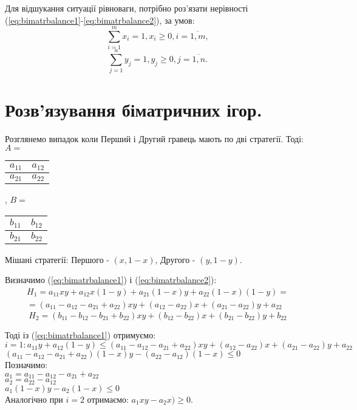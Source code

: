 \documentclass[12pt,a4paper]{book}
\begin{document}
Для відшукання ситуації рівноваги, потрібно роз’язати нерівності (\ref{eq:bimatrbalance1}-\ref{eq:bimatrbalance2}), за умов:
\[ \sum_{i=1}^m x_i = 1, x_i \geq 0, i = \overline{1,m}, \]
\[ \sum_{j=1}^n y_j = 1, y_j \geq 0, j = \overline{1,n}. \]

\clearpage

\section{Розв'язування біматричних ігор.}

Розглянемо випадок коли Перший і Другий гравець мають по дві стратегії. Тоді:\\
$A =$
\begin{tabular}{|c|c|}
\hline
$a_{1 1}$&$a_{1 2}$\\
\hline
$a_{2 1}$&$a_{2 2}$\\
\hline
\end{tabular},
$B =$
\begin{tabular}{|c|c|}
\hline
$b_{1 1}$&$b_{1 2}$\\
\hline
$b_{2 1}$&$b_{2 2}$\\
\hline
\end{tabular}

Мішані стратегії: Першого - $(x,1-x)$, Другого - $(y,1-y)$.

Визначимо (\ref{eq:bimatrbalance1}) і (\ref{eq:bimatrbalance2}):\\
\[\begin{array}{c}
H_1 = a_{11}xy + a_{12}x(1-y) + a_{21}(1-x)y + a_{22}(1-x)(1-y) =\\
= (a_{11}-a_{12}-a_{21}+a_{22})xy + (a_{12}-a_{22})x + (a_{21}-a_{22})y + a_{22}
\end{array}\]
\[H_2 = (b_{11}-b_{12}-b_{21}+b_{22})xy + (b_{12}-b_{22})x + (b_{21}-b_{22})y + b_{22} \]

Тоді із (\ref{eq:bimatrbalance1}) отримуємо:\\
$ i=1: a_{11}y+a_{12}(1-y) \leq (a_{11}-a_{12}-a_{21}+a_{22})xy + (a_{12}-a_{22})x + (a_{21}-a_{22})y + a_{22} $\\
$(a_{11}-a_{12}-a_{21}+a_{22})(1-x)y - (a_{22}-a_{12})(1-x) \leq 0$\\
Позначимо:\\
$a_1 = a_{11}-a_{12}-a_{21}+a_{22}$\\
$a_2 = a_{22}-a_{12}$\\
$a_1(1-x)y - a_2(1-x) \leq 0$\\
Аналогічно при $i=2$ отримаємо: $a_1xy - a_2x) \geq 0$.
\end{document}
